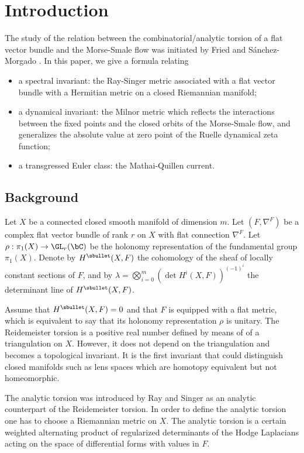 \section*{Introduction}
The study of the relation between the combinatorial/analytic torsion of
a flat vector bundle and the Morse-Smale flow was initiated by Fried \cite{Friedconj} and
Sánchez-Morgado \cite{MorgadoMorseSmale}.
In this paper, we give a formula relating
\begin{itemize}
\item a spectral invariant: the Ray-Singer metric associated
with a flat vector bundle with a Hermitian metric on a closed Riemannian
manifold;
\item a dynamical invariant: the Milnor metric which reflects
the interactions between the fixed points and the
closed orbits of the Morse-Smale flow, and generalizes the
absolute value at zero point of the Ruelle dynamical zeta function;
\item a transgressed Euler class:
the Mathai-Quillen current.
\end{itemize}

\subsection{Background}
Let $X$ be a connected closed smooth manifold of dimension $m$. Let
$(F,\nabla^{F})$ be a complex
flat vector bundle of rank $r$ on $X$ with flat connection
$\nabla^{F}$. Let $\rho: \pi_1(X)\rightarrow \GL_r(\bC)$ be the
holonomy representation of the
fundamental group $\pi_1(X)$.
Denote by $H^\sbullet(X,F)$ the cohomology of
the sheaf of locally constant sections of $F$, and by
$\lambda=\bigotimes_{i=0}^{m}(\det H^{i}(X,F))^{(-1)^{i}}$ the
determinant line of $H^{\sbullet}(X,F)$.

{Assume that $H^{\sbullet}(X,F)=0$ and that $F$ is equipped
with a flat metric, which is equivalent to say that its holonomy
representation $\rho$ is unitary.
The Reidemeister torsion \cite{ReidemeisterTorsion,FranzTorsion,dRTorsion} is a positive real number
defined by means of of a triangulation on $X$. However, it does not depend on the
triangulation and becomes a topological invariant. It is the first
invariant that could distinguish closed manifolds such as lens spaces
which are homotopy equivalent but not homeomorphic.}

The analytic torsion was introduced by Ray and Singer
\cite{RSTorsion} as an analytic counterpart of the Reidemeister torsion.
In order to define the analytic torsion one has to choose a
Riemannian metric on $X$. The analytic torsion is a certain
weighted alternating product of regularized determinants of the Hodge
Laplacians acting on the space of differential forms with values in
$F$.

